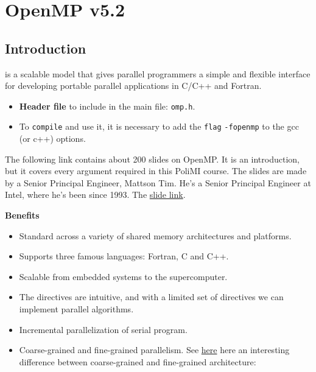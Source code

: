 \section{OpenMP v5.2}

\subsection{Introduction}

 is a scalable model that gives parallel programmers a simple and flexible interface for developing portable parallel applications in C/C++ and Fortran.
\begin{itemize}
    \item \textbf{Header file} to include in the main file: \texttt{omp.h}.
    \item To \texttt{compile} and use it, it is necessary to add the \texttt{flag} \texttt{-fopenmp} to the gcc (or c++) options.
\end{itemize}
The following link contains about 200 slides on OpenMP. It is an introduction, but it covers every argument required in this PoliMI course. The slides are made by a Senior Principal Engineer, Mattson Tim. He's a Senior Principal Engineer at Intel, where he's been since 1993. The \href{https://www.openmp.org/wp-content/uploads/Intro_To_OpenMP_Mattson.pdf}{slide link}.
\begin{flushleft}
    \textcolor{Green3}{ \textbf{Benefits}}
\end{flushleft}
\begin{itemize}
    \item Standard across a variety of shared memory architectures and platforms.
    \item Supports three famous languages: Fortran, C and C++.
    \item Scalable from embedded systems to the supercomputer.
    \item The directives are intuitive, and with a limited set of directives we can implement parallel algorithms.
    \item Incremental parallelization of serial program.
    \item Coarse-grained and fine-grained parallelism. See \href{https://www.geeksforgeeks.org/difference-between-fine-grained-and-coarse-grained-simd-architecture/}{here} here an interesting difference between coarse-grained and fine-grained architecture:
    \begin{center}
    \end{center}
\end{itemize}

